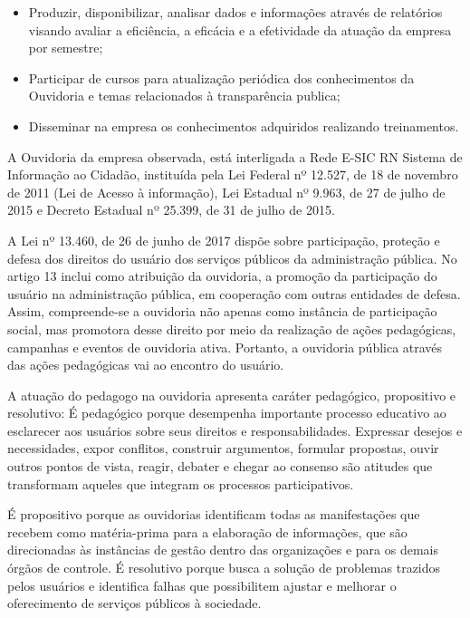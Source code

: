\begin{refsection}
\begin{itemize}
        \item Produzir, disponibilizar, analisar dados e informações através de relatórios visando avaliar a eficiência, a eficácia e a efetividade da atuação da empresa por semestre;  
    
        \item Participar de cursos para atualização periódica dos conhecimentos da Ouvidoria e temas relacionados à transparência publica;  
    
        \item Disseminar na empresa os conhecimentos adquiridos realizando treinamentos.  
    \end{itemize}

    A Ouvidoria da empresa observada, está interligada a Rede E-SIC RN Sistema de Informação ao Cidadão, instituída pela Lei Federal nº 12.527, de 18 de novembro de 2011 (Lei de Acesso à informação), Lei Estadual nº 9.963, de 27 de julho de 2015 e Decreto Estadual nº 25.399, de 31 de julho de 2015.

    \nocite{Lei12527-2011}

    A Lei nº 13.460, de 26 de junho de 2017 dispõe sobre participação, proteção e defesa dos direitos do usuário dos serviços públicos da administração pública. No artigo 13 inclui como atribuição da ouvidoria, a promoção da participação do usuário na administração pública, em cooperação com outras entidades de defesa. Assim, compreende-se a ouvidoria não apenas como instância de participação social, mas promotora desse direito por meio da realização de ações pedagógicas, campanhas e eventos de ouvidoria ativa. Portanto, a ouvidoria pública através das ações pedagógicas vai ao encontro do usuário.  

    A atuação do pedagogo na ouvidoria apresenta caráter pedagógico, propositivo e resolutivo: É pedagógico porque desempenha importante processo educativo ao esclarecer aos usuários sobre seus direitos e responsabilidades. Expressar desejos e necessidades, expor conflitos, construir argumentos, formular propostas, ouvir outros pontos de vista, reagir, debater e chegar ao consenso são atitudes que transformam aqueles que integram os processos participativos. 

    É propositivo porque as ouvidorias identificam todas as manifestações que recebem como matéria-prima para a elaboração de informações, que são direcionadas às instâncias de gestão dentro das organizações e para os demais órgãos de controle. É resolutivo porque busca a solução de problemas trazidos pelos usuários e identifica falhas que possibilitem ajustar e melhorar o oferecimento de serviços públicos à sociedade. 


\end{refsection}
